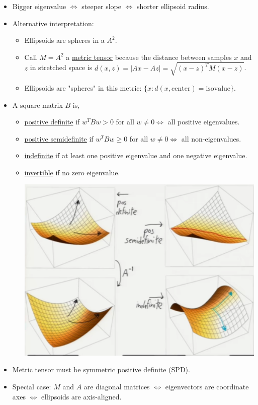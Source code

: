 \documentclass[10pt]{article}
\begin{document}
\begin{itemize}
\begin{itemize}
				\end{itemize}
			\item Bigger eigenvalue $\Leftrightarrow$ steeper slope $\Leftrightarrow$ shorter ellipsoid radius.
			\item Alternative interpretation:
				\begin{itemize}
					\item Ellipsoids are spheres in a  $A^{2}$.
					\item Call $M = A^{2}$ a \underline{metric tensor} because the distance between samples $x$ and $z$ in stretched space is $d(x, z) = |Ax - Az| = \sqrt{(x-z)^{T}M(x-z)}$.
					\item Ellipsoids are "spheres" in this metric: $\{x: d(x, \text{center}) = \text{isovalue}\}$.
				\end{itemize}
			\item A square matrix $B$ is,
				\begin{itemize}
					\item \underline{positive definite} if $w^{T}Bw > 0$ for all $w \neq 0 \Leftrightarrow$ all positive eigenvalues.
					\item \underline{positive semidefinite} if $w^{T}Bw \geq 0$ for all $w \neq 0 \Leftrightarrow$ all non-eigenvalues.
					\item \underline{indefinite} if at least one positive eigenvalue and one negative eigenvalue.
					\item \underline{invertible} if no zero eigenvalue.
					\begin{center}
						\includegraphics[scale=0.5]{images/matrices}
					\end{center}
				\end{itemize}
			\item Metric tensor must be symmetric positive definite (SPD).
			\item Special case: $M$ and $A$ are diagonal matrices $\Leftrightarrow$ eigenvectors are coordinate axes $\Leftrightarrow$ ellipsoids are axis-aligned.
		\end{itemize} 
	
\end{document}

